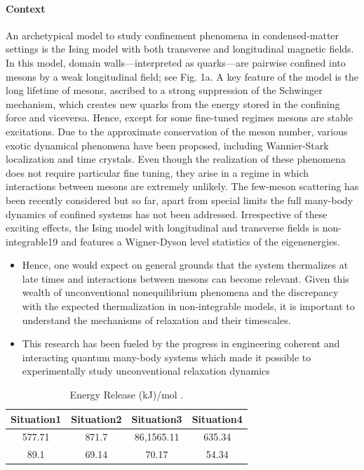 \documentclass{article}
\begin{document}
\paragraph{Context} 
An archetypical model to study confinement phenomena in condensed-matter settings is the Ising model with both transverse and longitudinal magnetic fields. In this model, domain walls—interpreted as quarks—are pairwise confined into mesons by a weak longitudinal field; see Fig. 1a. A key feature of the model is the long lifetime of mesons, ascribed to a strong suppression of the Schwinger mechanism\cite{ghi}, which creates new quarks from the energy stored in the confining force and viceversa. Hence, except for some fine-tuned regimes mesons are stable excitations. Due to the approximate conservation of the meson number, various exotic dynamical phenomena have been proposed, including Wannier-Stark localization\cite{jkl} and time crystals\cite{mno}. Even though the realization of these phenomena does not require particular fine tuning, they arise in a regime in which interactions between mesons are extremely unlikely. The few-meson scattering has been recently considered  but so far, apart from special limits\cite{pqr} the full many-body dynamics of confined systems has not been addressed. Irrespective of these exciting effects, the Ising model with longitudinal and transverse fields is non-integrable19 and features a Wigner-Dyson level statistics of the eigenenergies\cite{stu}.





\begin{itemize}
    \item  Hence, one would expect on general grounds that the system thermalizes at late times and interactions between mesons can become relevant. Given this wealth of unconventional nonequilibrium phenomena and the discrepancy with the expected thermalization in non-integrable models, it is important to understand the mechanisms of relaxation and their timescales.
    \item This research has been fueled by the progress in engineering coherent and interacting quantum many-body systems which made it possible to experimentally study unconventional relaxation dynamics
\end{itemize}







\begin{table}
\centering
\caption{\label{tab1} Energy Release (kJ)/mol .} 
\begin{tabular}{cccc}
\hline
Situation1 & Situation2 & Situation3 & Situation4 \\
\hline
577.71 & 871.7 & 86,1565.11 & 635.34\\
89.1 & 69.14 & 70.17 & 54.34\\
\hline
\end{tabular}
\end{table}
\end{document}
